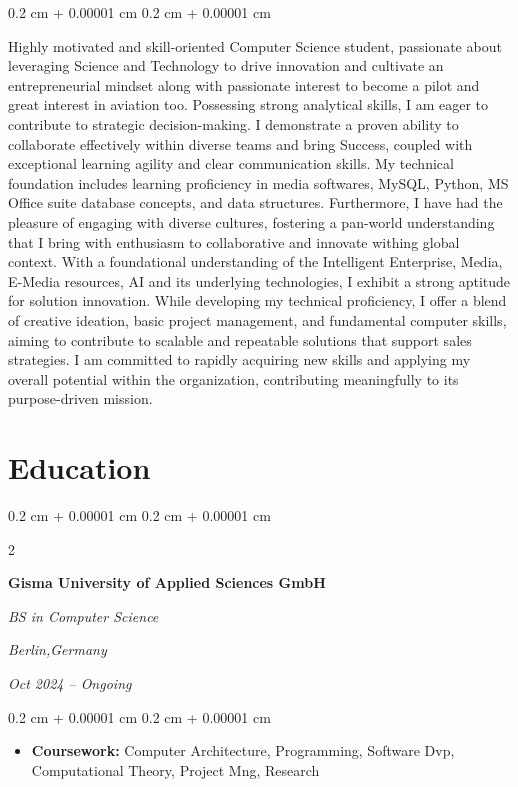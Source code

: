 \documentclass[10pt, letterpaper]{article}
\newenvironment{highlights}{
    \begin{itemize}[
        topsep=0.10 cm,
        parsep=0.10 cm,
        partopsep=0pt,
        itemsep=0pt,
        leftmargin=0.4 cm + 10pt
    ]
}{
    \end{itemize}
} %
\newenvironment{onecolentry}{
    \begin{adjustwidth}{
        0.2 cm + 0.00001 cm
    }{
        0.2 cm + 0.00001 cm
    }
}{
    \end{adjustwidth}
}
\newenvironment{twocolentry}[2][]{
    \onecolentry
    \def\secondColumn{#2}
    \setcolumnwidth{\fill, 4.5 cm}
    \begin{paracol}{2}
}{
    \switchcolumn \raggedleft \secondColumn
    \end{paracol}
    \endonecolentry
}
\begin{document}
        
        \begin{onecolentry}
Highly motivated and skill-oriented Computer Science student, passionate about leveraging Science and Technology to drive innovation and cultivate an entrepreneurial mindset along with passionate interest to become a pilot and great interest in aviation too. Possessing strong analytical skills, I am eager to contribute to strategic decision-making. I demonstrate a proven ability to collaborate effectively within diverse teams and bring Success, coupled with exceptional learning agility and clear communication skills. My technical foundation includes learning proficiency in media softwares, MySQL, Python, MS Office suite database concepts, and data structures. Furthermore, I have had the pleasure of engaging with diverse cultures, fostering a pan-world understanding that I bring with enthusiasm to collaborative and innovate withing global context. With a foundational understanding of the Intelligent Enterprise, Media, E-Media resources, AI and its underlying technologies, I exhibit a strong aptitude for solution innovation. While developing my technical proficiency, I offer a blend of creative ideation, basic project management, and fundamental computer skills, aiming to contribute to scalable and repeatable solutions that support sales strategies. I am committed to rapidly acquiring new skills and applying my overall potential within the organization, contributing meaningfully to its purpose-driven mission. 
        \end{onecolentry}

        \vspace{0.2 cm}

     


    

    \section{Education}



        
        \begin{twocolentry}{
            \textit{Berlin,Germany}
            
        \textit{Oct 2024 – Ongoing}}
            \textbf{Gisma University of Applied Sciences GmbH}

            \textit{BS in Computer Science}
        \end{twocolentry}

        \vspace{0.10 cm}
        \begin{onecolentry}
            \begin{highlights}
                \item \textbf{Coursework:} Computer Architecture, Programming, Software Dvp, Computational Theory, Project Mng, Research
            \end{highlights}
        \end{onecolentry}
\end{document}
